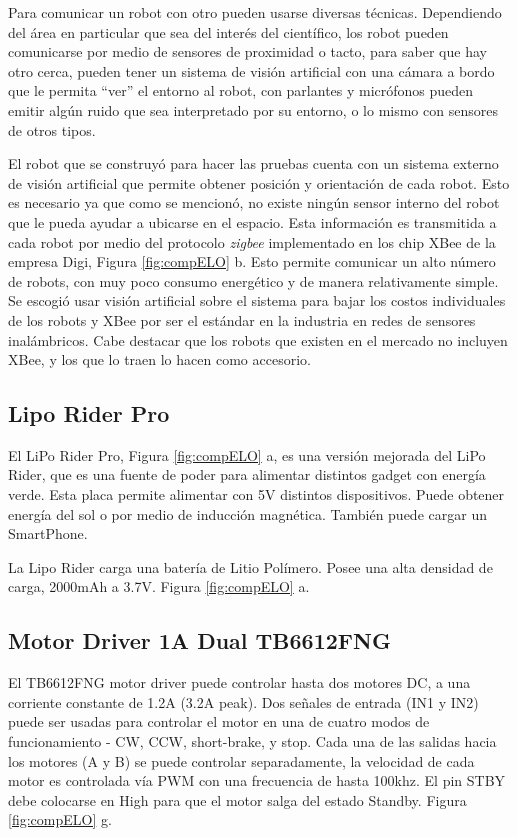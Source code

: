 Para comunicar un robot con otro pueden usarse diversas técnicas. Dependiendo del área en particular que sea del interés del científico, los robot pueden comunicarse por medio de sensores de proximidad o tacto, para saber que hay otro cerca, pueden tener un sistema de visión artificial con una cámara a bordo que le permita “ver” el entorno al robot, con parlantes y micrófonos pueden emitir algún ruido que sea interpretado por su entorno, o lo mismo con sensores de otros tipos.

El robot que se construyó para hacer las pruebas cuenta con un sistema externo de visión artificial que permite obtener posición y orientación de cada robot. Esto es necesario ya que como se mencionó, no existe ningún sensor interno del robot que le pueda ayudar a ubicarse en el espacio. Esta información es transmitida a cada robot por medio del protocolo \textit{zigbee} implementado en los chip XBee de la empresa Digi, Figura \ref{fig:compELO} b. Esto permite comunicar un alto número de robots, con muy poco consumo energético y de manera relativamente simple. Se escogió usar visión artificial sobre el sistema para bajar los costos individuales de los robots y XBee por ser el estándar en la industria en redes de sensores inalámbricos. Cabe destacar que los robots que existen en el mercado no incluyen XBee, y los que lo traen lo hacen como accesorio. 

\subsection{Lipo Rider Pro}

El LiPo Rider Pro, Figura \ref{fig:compELO} a, es una versión mejorada del LiPo Rider, que es una fuente de poder para alimentar distintos gadget con energía verde. Esta placa permite alimentar con 5V distintos dispositivos. Puede obtener energía del sol o por medio de inducción magnética. También puede cargar un SmartPhone.

La Lipo Rider carga una batería de Litio Polímero. Posee una alta densidad de carga, 2000mAh a 3.7V. Figura \ref{fig:compELO} a.

\subsection{Motor Driver 1A Dual TB6612FNG}
El TB6612FNG motor driver puede controlar hasta dos motores DC, a una corriente constante de 1.2A (3.2A peak). Dos señales de entrada (IN1 y IN2) puede ser usadas para controlar el motor en una de cuatro modos de funcionamiento - CW, CCW, short-brake, y stop. Cada una de las salidas hacia los motores (A y B) se puede controlar separadamente, la velocidad de cada motor es controlada vía PWM con una frecuencia de hasta 100khz. El pin STBY debe colocarse en High para que el motor salga del estado Standby. Figura \ref{fig:compELO} g.


